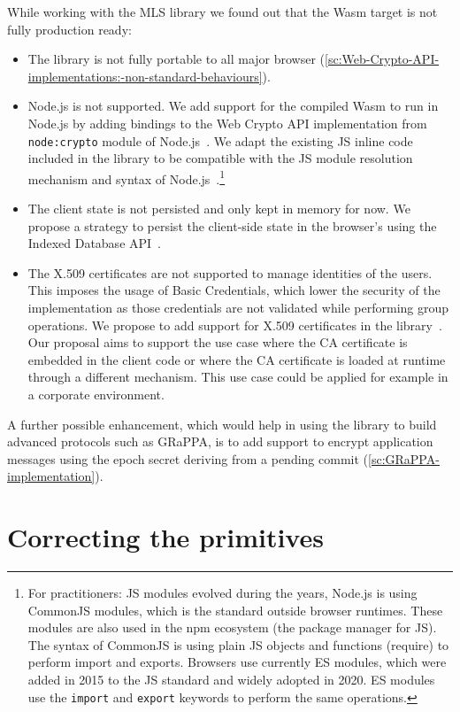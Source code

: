 While working with the MLS library we found out that the Wasm target
is not fully production ready:
\begin{itemize}
    \item The library is not fully portable to all major browser (\cref{sc:Web-Crypto-API-implementations:-non-standard-behaviours}).
    \item Node.js is not supported. We add support for the compiled Wasm to run in Node.js by adding bindings to the Web Crypto API implementation from \texttt{node:crypto} module of Node.js~\cite{NodeJsWebCryptoAPI}. We adapt the existing JS inline code included in the library to be compatible with the JS module resolution mechanism and syntax of Node.js~\cite{AWSNodeJSCodeContributions}.\footnote{For practitioners: JS modules evolved during the years, Node.js is using CommonJS modules, which is the standard outside browser runtimes. These modules are also used in the npm ecosystem (the package manager for JS). The syntax of CommonJS is using plain JS objects and functions (require) to perform import and exports. Browsers use currently ES modules, which were added in 2015 to the JS standard and widely adopted in 2020. ES modules use the \texttt{import} and \texttt{export} keywords to perform the same operations.}
    \item The client state is not persisted and only kept in memory for now. We propose a strategy to persist the client-side state in the browser's using the Indexed Database API~\cite{MlsRsWebStorageProvider, IndexedDBAPI}.
    \item The X.509 certificates are not supported to manage identities of the users. This imposes the usage of Basic Credentials, which lower the security of the implementation as those credentials are not validated while performing group operations. We propose to add support for X.509 certificates in the library~\cite{MlsRsX509Certificates}. Our proposal aims to support the use case where the CA certificate is embedded in the client code or where the CA certificate is loaded at runtime through a different mechanism. This use case could be applied for example in a corporate environment.
\end{itemize}

A further possible enhancement, which would help in
using the library to build advanced protocols such as GRaPPA,
is to add support to encrypt application messages
using the epoch secret deriving from a pending commit (\cref{sc:GRaPPA-implementation}).

\section{Correcting the primitives}\label{sc:correcting-primitives}

